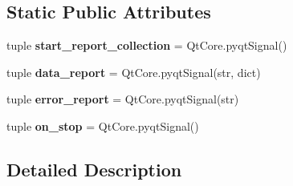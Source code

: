 \subsection*{Static Public Attributes}
\begin{DoxyCompactItemize}
\item 
\hypertarget{classcommotion__client_1_1GUI_1_1welcome__page_1_1ViewPort_a38aec86a853649cd2b89b75edafdb97f}{tuple {\bfseries start\+\_\+report\+\_\+collection} = Qt\+Core.\+pyqt\+Signal()}\label{classcommotion__client_1_1GUI_1_1welcome__page_1_1ViewPort_a38aec86a853649cd2b89b75edafdb97f}

\item 
\hypertarget{classcommotion__client_1_1GUI_1_1welcome__page_1_1ViewPort_a6b1fe8a1472a229de25f22ea1f365147}{tuple {\bfseries data\+\_\+report} = Qt\+Core.\+pyqt\+Signal(str, dict)}\label{classcommotion__client_1_1GUI_1_1welcome__page_1_1ViewPort_a6b1fe8a1472a229de25f22ea1f365147}

\item 
\hypertarget{classcommotion__client_1_1GUI_1_1welcome__page_1_1ViewPort_aae1ffc42b8978d237c0cb80374f2c726}{tuple {\bfseries error\+\_\+report} = Qt\+Core.\+pyqt\+Signal(str)}\label{classcommotion__client_1_1GUI_1_1welcome__page_1_1ViewPort_aae1ffc42b8978d237c0cb80374f2c726}

\item 
\hypertarget{classcommotion__client_1_1GUI_1_1welcome__page_1_1ViewPort_a505fd5038731ed162e8b694241157cdb}{tuple {\bfseries on\+\_\+stop} = Qt\+Core.\+pyqt\+Signal()}\label{classcommotion__client_1_1GUI_1_1welcome__page_1_1ViewPort_a505fd5038731ed162e8b694241157cdb}

\end{DoxyCompactItemize}


\subsection{Detailed Description}
\begin{DoxyVerb}\end{DoxyVerb}
 

